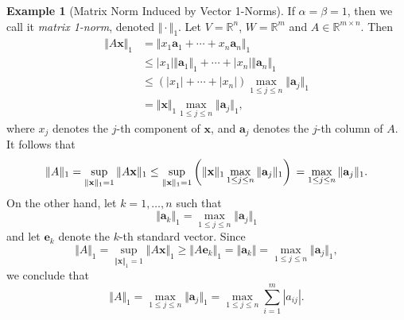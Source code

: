 \documentclass[12pt]{article}
\theoremstyle{definition}
\newtheorem{example}[theorem]{Example}
\begin{document}
\begin{example}[Matrix Norm Induced by Vector 1-Norms]
    If $\alpha = \beta = 1$, then we call it \textit{matrix 1-norm}, denoted $\Vert\cdot\Vert_1$. Let $V=\mathbb{R}^n$, $W=\mathbb{R}^m$ and $A\in\mathbb{R}^{m\times n}$. Then
    \[
    \begin{aligned}
        \Vert A\mathbf{x}\Vert_1
        &= \Vert x_1 \mathbf{a}_1 + \cdots + x_n \mathbf{a}_n \Vert_1 \\
        &\leq |x_1|\Vert\mathbf{a}_1\Vert_1 + \cdots + |x_n|\Vert\mathbf{a}_n\Vert_1 \\
        &\leq (|x_1| + \cdots + |x_n|) \max_{1\leq j\leq n} \Vert\mathbf{a}_j\Vert_1 \\
        &= \Vert\mathbf{x}\Vert_1 \max_{1\leq j\leq n} \Vert\mathbf{a}_j\Vert_1,
    \end{aligned}
    \]
    where $x_j$ denotes the $j$-th component of $\mathbf{x}$, and $\mathbf{a}_j$ denotes the $j$-th column of $A$. It follows that
    \[ \Vert A\Vert_1 
    = \sup_{\Vert\mathbf{x}\Vert_1=1} \Vert A\mathbf{x}\Vert_1 
    \leq \sup_{\Vert\mathbf{x}\Vert_1=1} \left( \Vert\mathbf{x}\Vert_1 \max_{1\leq j\leq n} \Vert\mathbf{a}_j\Vert_1 \right) \\
    = \max_{1\leq j\leq n} \Vert\mathbf{a}_j\Vert_1.
    \]
    On the other hand, let $k=1,\ldots,n$ such that
    \[ \Vert \mathbf{a}_k \Vert_1 = \max_{1\leq j\leq n} \Vert\mathbf{a}_j\Vert_1 \]
    and let $\mathbf{e}_k$ denote the $k$-th standard vector. Since
    \[ \Vert A\Vert_1 
    = \sup_{\Vert\mathbf{x}\Vert_1 = 1} \Vert A\mathbf{x}\Vert_1 
    \geq \Vert A\mathbf{e}_k\Vert_1
    = \Vert \mathbf{a}_k\Vert
    = \max_{1\leq j\leq n} \Vert\mathbf{a}_j\Vert_1,
    \]
    we conclude that
    \[ \Vert A\Vert_1 
    = \max_{1\leq j\leq n} \Vert\mathbf{a}_j\Vert_1 
    = \max_{1\leq j\leq n} \sum_{i=1}^m |a_{ij}|. 
    \]
\end{example}
\end{document}
